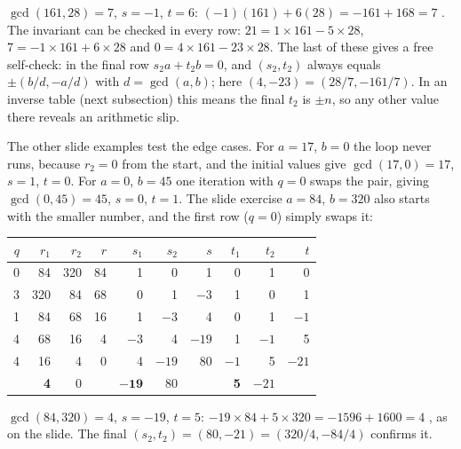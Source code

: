 $\gcd(161, 28) = 7$, $s = -1$, $t = 6$: \;$(-1)(161) + 6(28) = -161 + 168 = 7$ \checkmark. The invariant can be checked in every row: $21 = 1 \times 161 - 5 \times 28$, $7 = -1 \times 161 + 6 \times 28$ and $0 = 4 \times 161 - 23 \times 28$. The last of these gives a free self-check: in the final row $s_2 a + t_2 b = 0$, and $(s_2, t_2)$ always equals $\pm(b/d, -a/d)$ with $d = \gcd(a, b)$; here $(4, -23) = (28/7, -161/7)$. In an inverse table (next subsection) this means the final $t_2$ is $\pm n$, so any other value there reveals an arithmetic slip.

The other slide examples test the edge cases. For $a = 17$, $b = 0$ the loop never runs, because $r_2 = 0$ from the start, and the initial values give $\gcd(17, 0) = 17$, $s = 1$, $t = 0$. For $a = 0$, $b = 45$ one iteration with $q = 0$ swaps the pair, giving $\gcd(0, 45) = 45$, $s = 0$, $t = 1$. The slide exercise $a = 84$, $b = 320$ also starts with the smaller number, and the first row ($q = 0$) simply swaps it:
\begin{center}\small
\begin{tabular}{@{}r|rrr|rrr|rrr@{}}
\toprule
$q$ & $r_1$ & $r_2$ & $r$ & $s_1$ & $s_2$ & $s$ & $t_1$ & $t_2$ & $t$\\
\midrule
0 & 84 & 320 & 84 & 1 & 0 & 1 & 0 & 1 & 0\\
3 & 320 & 84 & 68 & 0 & 1 & $-3$ & 1 & 0 & 1\\
1 & 84 & 68 & 16 & 1 & $-3$ & 4 & 0 & 1 & $-1$\\
4 & 68 & 16 & 4 & $-3$ & 4 & $-19$ & 1 & $-1$ & 5\\
4 & 16 & 4 & 0 & 4 & $-19$ & 80 & $-1$ & 5 & $-21$\\
 & \textbf{4} & 0 & & $\mathbf{-19}$ & 80 & & \textbf{5} & $-21$ & \\
\bottomrule
\end{tabular}
\end{center}
$\gcd(84, 320) = 4$, $s = -19$, $t = 5$: \;$-19 \times 84 + 5 \times 320 = -1596 + 1600 = 4$ \checkmark, as on the slide. The final $(s_2, t_2) = (80, -21) = (320/4, -84/4)$ confirms it.

